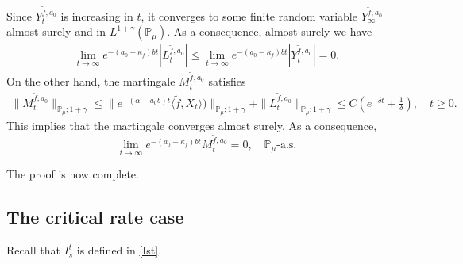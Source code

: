 \documentclass[12pt,a4paper]{amsart}
\theoremstyle{plain}
\theoremstyle{definition}
\numberwithin{equation}{section}
\begin{document}
Since $Y_t^{\tilde{f},a_0}$ is increasing in $t$, it converges to some finite random variable $Y_{\infty}^{\tilde{f},a_0}$ almost surely and in $L^{1+\gamma}(\mathbb{P}_{\mu})$.
	As a consequence, almost surely we have
\begin{align*}
    \lim_{t\rightarrow \infty}e^{-(a_0 - \kappa_f)bt}|L_t^{\tilde{f},a_0}|
    \leq  \lim_{t\rightarrow \infty}e^{-(a_0 - \kappa_f)bt}|Y_t^{\tilde{f},a_0}|=0.
\end{align*}
	On the other hand, the martingale $M_t^{\tilde{f},a_0}$ satisfies
\begin{align*}
    \|M_t^{\tilde{f},a_0}\|_{\mathbb{P}_{\mu};1+\gamma}\leq  \|e^{-(\alpha-a_0 b)t}\langle \tilde{f},X_t\rangle)\|_{\mathbb{P}_{\mu};1+\gamma}+\|L_t^{\tilde{f},a_0}\|_{\mathbb{P}_{\mu};1+\gamma}\leq C(e^{-\delta t}+\frac{1}{\delta}),\quad t\geq 0.
\end{align*}
	This implies that the martingale converges almost surely.
	As a consequence,
\[
	\lim_{t\rightarrow\infty} e^{-(a_0-\kappa_f)bt}M_t^{\tilde{f},a_0}
	=0,
	\quad \mathbb P_\mu\text{-a.s.}
\]
	
	The proof is now complete.

\subsection{The critical rate case}

Recall that $I_s^t$ is defined in \eqref{Ist}.
\end{document}
